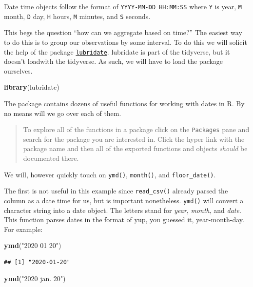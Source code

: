\documentclass[
]{book}
\newenvironment{Shaded}{\begin{snugshade}}{\end{snugshade}}
\newcommand{\KeywordTok}[1]{\textcolor[rgb]{0.13,0.29,0.53}{\textbf{#1}}}
\newcommand{\NormalTok}[1]{#1}
\newcommand{\StringTok}[1]{\textcolor[rgb]{0.31,0.60,0.02}{#1}}
\begin{document}
Date time objects follow the format of \texttt{YYYY-MM-DD\ HH:MM:SS} where \texttt{Y} is year, \texttt{M} month, \texttt{D} day, \texttt{H} hours, \texttt{M} minutes, and \texttt{S} seconds.

This begs the question ``how can we aggregate based on time?'' The easiest way to do this is to group our observations by some interval. To do this we will solicit the help of the package \href{https://lubridate.tidyverse.org}{\texttt{lubridate}}. lubridate is part of the tidyverse, but it doesn't loadwith the tidyverse. As such, we will have to load the package ourselves.

\begin{Shaded}
\begin{Highlighting}[]
\KeywordTok{library}\NormalTok{(lubridate)}
\end{Highlighting}
\end{Shaded}

The package contains dozens of useful functions for working with dates in R. By no means will we go over each of them.

\begin{quote}
To explore all of the functions in a package click on the \texttt{Packages} pane and search for the package you are interested in. Click the hyper link with the package name and then all of the exported functions and objects \emph{should} be documented there.
\end{quote}

We will, however quickly touch on \texttt{ymd()}, \texttt{month()}, and \texttt{floor\_date()}.

The first is not useful in this example since \texttt{read\_csv()} already parsed the column as a date time for us, but is important nonetheless. \texttt{ymd()} will convert a character string into a date object. The letters stand for \emph{year}, \emph{month}, and \emph{date}. This function parses dates in the format of yup, you guessed it, year-month-day. For example:

\begin{Shaded}
\begin{Highlighting}[]
\KeywordTok{ymd}\NormalTok{(}\StringTok{"2020 01 20"}\NormalTok{)}
\end{Highlighting}
\end{Shaded}

\begin{verbatim}
## [1] "2020-01-20"
\end{verbatim}

\begin{Shaded}
\begin{Highlighting}[]
\KeywordTok{ymd}\NormalTok{(}\StringTok{"2020 jan. 20"}\NormalTok{)}
\end{Highlighting}
\end{Shaded}
\end{document}
